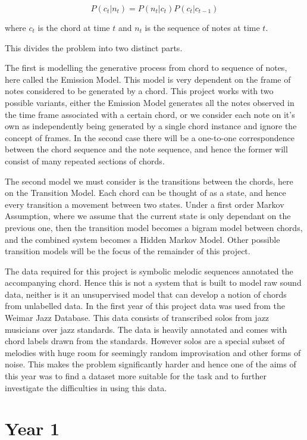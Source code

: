 \documentclass[bsc,singlespacing,logo, parskip, deptreport]{infthesis}
\begin{document}
\begin{equation} \label{eq1}
P(c_t | n_t) = P(n_t | c_t) P(c_t | c_{t-1})
\end{equation}

where $c_t$ is the chord at time $t$ and $n_t$ is the sequence of notes at time $t$.

This divides the problem into two distinct parts.

The first is modelling the generative process from chord to sequence of notes, here called the Emission Model. This model is very dependent on the frame of notes considered to be generated by a chord. This project works with two possible variants, either the Emission Model generates all the notes observed in the time frame associated with a certain chord, or we consider each note on it's own as independently being generated by a single chord instance and ignore the concept of frames. In the second case there will be a one-to-one correspondence between the chord sequence and the note sequence, and hence the former will consist of many repeated sections of chords.

The second model we must consider is the transitions between the chords, here on the Transition Model. Each chord can be thought of as a state, and hence every transition a movement between two states. Under a first order Markov Assumption, where we assume that the current state is only dependant on the previous one, then the transition model becomes a bigram model between chords, and the combined system becomes a Hidden Markov Model. Other possible transition models will be the focus of the remainder of this project. 

The data required for this project is symbolic melodic sequences annotated the accompanying chord. Hence this is not a system that is built to model raw sound data, neither is it an unsupervised model that can develop a notion of chords from unlabelled data. In the first year of this project data was used from the Weimar Jazz Database. This data consists of transcribed solos from jazz musicians over jazz standards. The data is heavily annotated and comes with chord labels drawn from the standards. However solos are a special subset of melodies with huge room for seemingly random improvisation and other forms of noise. This makes the problem significantly harder and hence one of the aims of this year was to find a dataset more suitable for the task and to further investigate the difficulties in using this data. 

\chapter{Year 1}
\end{document}
